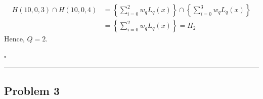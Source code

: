\documentclass[12pt]{article}
\newcommand*{\QEDB}{\hfill\ensuremath{\square}}
\newcommand{\CBrackets}[1]{\left\{#1\right\}}
\newcommand{\ParTh}[1]{\left(#1\right)}
\newcommand{\horrule}[1]{\rule{\linewidth}{#1}}
\begin{document}
\begin{align}
H\ParTh{10,0,3}\cap H\ParTh{10,0,4}&=\CBrackets{\sum_{i=0}^{2}w_qL_q\ParTh{x}}\cap\CBrackets{\sum_{i=0}^{3}w_qL_q\ParTh{x}}\\
&=\CBrackets{\sum_{i=0}^{2}w_qL_q\ParTh{x}}=H_2
\end{align}
Hence, $Q=2$.

\QEDB

\horrule{0.5pt}

\subsection*{Problem 3}
\end{document}
